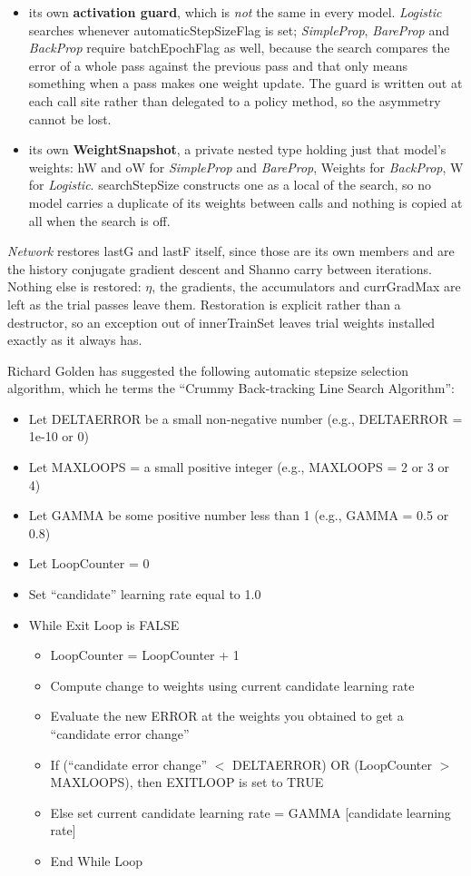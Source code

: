 \documentclass{report}
\begin{document}
\begin{itemize}
\item its own {\bf activation guard}, which is {\em not} the same in every
      model.  {\em Logistic} searches whenever automaticStepSizeFlag is
      set; {\em SimpleProp}, {\em BareProp} and {\em BackProp} require
      batchEpochFlag as well, because the search compares the error of a
      whole pass against the previous pass and that only means something
      when a pass makes one weight update.  The guard is written out at
      each call site rather than delegated to a policy method, so the
      asymmetry cannot be lost.
\item its own {\bf WeightSnapshot}, a private nested type holding just that
      model's weights: hW and oW for {\em SimpleProp} and {\em BareProp},
      Weights for {\em BackProp}, W for {\em Logistic}.
      searchStepSize constructs one as a local of the search, so no model
      carries a duplicate of its weights between calls and nothing is
      copied at all when the search is off.
\end{itemize}

{\em Network} restores lastG and lastF itself, since those are its own
members and are the history conjugate gradient descent and Shanno carry
between iterations.  Nothing else is restored: $\eta$, the gradients, the
accumulators and currGradMax are left as the trial passes leave them.
Restoration is explicit rather than a destructor, so an exception out of
innerTrainSet leaves trial weights installed exactly as it always has.

Richard Golden has suggested the following automatic stepsize
selection algorithm, which he terms the ``Crummy Back-tracking Line
Search Algorithm'':

\begin{itemize}
\item Let DELTAERROR be a small non-negative number (e.g., DELTAERROR
= 1e-10 or 0)
\item Let MAXLOOPS = a small positive integer (e.g., MAXLOOPS = 2 or 3
or 4)
\item Let GAMMA be some positive number less than 1 (e.g., GAMMA = 0.5
or 0.8)
\item Let LoopCounter = 0
\item Set ``candidate'' learning rate equal to 1.0
\item While Exit Loop is FALSE
\begin{itemize}
\item LoopCounter = LoopCounter + 1
\item Compute change to weights using current candidate learning rate
\item Evaluate the new ERROR at the weights you obtained to get a
``candidate error change''
\item If (``candidate error change'' $<$ DELTAERROR) OR (LoopCounter
$>$ MAXLOOPS), then EXITLOOP is set to TRUE
\item Else set current candidate learning rate = GAMMA [candidate
learning rate]
\item End While Loop
\end{itemize}
\end{itemize}
\end{document}
